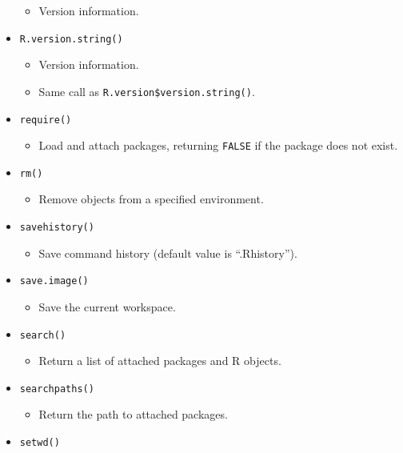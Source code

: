 \documentclass[
]{book}
\providecommand{\tightlist}{%
  \setlength{\itemsep}{0pt}\setlength{\parskip}{0pt}}
\begin{document}
\begin{itemize}
  \begin{itemize}
  \tightlist
  \item
    Version information.
  \end{itemize}
\item
  \texttt{R.version.string()}

  \begin{itemize}
  \tightlist
  \item
    Version information.
  \item
    Same call as \texttt{R.version\$version.string()}.
  \end{itemize}
\item
  \texttt{require()}

  \begin{itemize}
  \tightlist
  \item
    Load and attach packages, returning \texttt{FALSE} if the package does not exist.
  \end{itemize}
\item
  \texttt{rm()}

  \begin{itemize}
  \tightlist
  \item
    Remove objects from a specified environment.
  \end{itemize}
\item
  \texttt{savehistory()}

  \begin{itemize}
  \tightlist
  \item
    Save command history (default value is ``.Rhistory'').
  \end{itemize}
\item
  \texttt{save.image()}

  \begin{itemize}
  \tightlist
  \item
    Save the current workspace.
  \end{itemize}
\item
  \texttt{search()}

  \begin{itemize}
  \tightlist
  \item
    Return a list of attached packages and R objects.
  \end{itemize}
\item
  \texttt{searchpaths()}

  \begin{itemize}
  \tightlist
  \item
    Return the path to attached packages.
  \end{itemize}
\item
  \texttt{setwd()}


\end{itemize}
\end{document}
